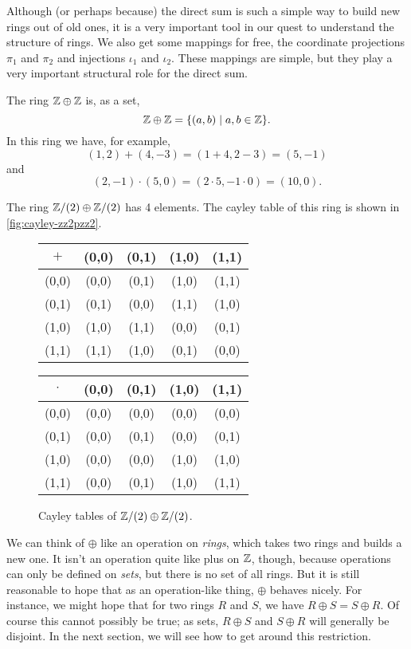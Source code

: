 Although (or perhaps because) the direct sum is such a simple way to build new rings out of old ones, it is a very important tool in our quest to understand the structure of rings. We also get some mappings for free, the coordinate projections \(\pi_1\) and \(\pi_2\) and injections \(\iota_1\) and \(\iota_2\). These mappings are simple, but they play a very important structural role for the direct sum.

\begin{examples}
\item The ring \(\mathbb{Z} \oplus \mathbb{Z}\) is, as a set, \[ \mathbb{Z} \oplus \mathbb{Z} = \{ (a,b) \mid a,b \in \mathbb{Z} \}. \] In this ring we have, for example, \[ (1,2) + (4,-3) = (1+4, 2-3) = (5,-1) \] and \[ (2,-1) \cdot (5,0) = (2 \cdot 5, -1 \cdot 0) = (10,0). \]
\item The ring \(\mathbb{Z}/(2) \oplus \mathbb{Z}/(2)\) has 4 elements. The cayley table of this ring is shown in \autoref{fig:cayley-zz2pzz2}.
\begin{figure}[h!]
\begin{center}
\small
\addtolength{\tabcolsep}{-2pt}
\begin{tabular}{c|cccc}
\(+\) & (0,0) & (0,1) & (1,0) & (1,1) \\ \hline
(0,0) & (0,0) & (0,1) & (1,0) & (1,1) \\
(0,1) & (0,1) & (0,0) & (1,1) & (1,0) \\
(1,0) & (1,0) & (1,1) & (0,0) & (0,1) \\
(1,1) & (1,1) & (1,0) & (0,1) & (0,0)
\end{tabular}
\quad
\begin{tabular}{c|cccc} \setlength{\tabcolsep}{5pt}
\(\cdot\)
      & (0,0) & (0,1) & (1,0) & (1,1) \\ \hline
(0,0) & (0,0) & (0,0) & (0,0) & (0,0) \\
(0,1) & (0,0) & (0,1) & (0,0) & (0,1) \\
(1,0) & (0,0) & (0,0) & (1,0) & (1,0) \\
(1,1) & (0,0) & (0,1) & (1,0) & (1,1)
\end{tabular}
\addtolength{\tabcolsep}{2pt}
\end{center}
\caption{Cayley tables of \(\mathbb{Z}/(2) \oplus \mathbb{Z}/(2)\).\label{fig:cayley-zz2pzz2}}
\end{figure}
\end{examples}

We can think of \(\oplus\) like an operation on \emph{rings}, which takes two rings and builds a new one. It isn't an operation quite like plus on \(\mathbb{Z}\), though, because operations can only be defined on \emph{sets}, but there is no set of all rings. But it is still reasonable to hope that as an operation-like thing, \(\oplus\) behaves nicely. For instance, we might hope that for two rings \(R\) and \(S\), we have \(R \oplus S = S \oplus R\). Of course this cannot possibly be true; as sets, \(R \oplus S\) and \(S \oplus R\) will generally be disjoint. In the next section, we will see how to get around this restriction.

